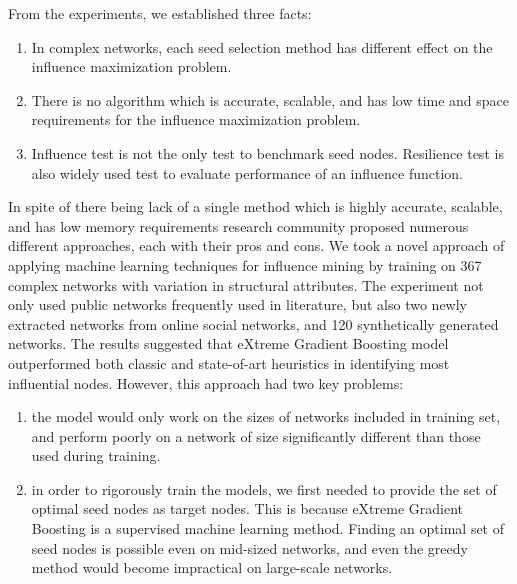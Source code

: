 	From the experiments, we established three facts:
	
	\begin{enumerate}
		\item In complex networks, each seed selection method has different effect on the influence maximization problem.
		
		\item There is no algorithm which is accurate, scalable, and has low time and space requirements for the influence maximization problem.
		
		\item Influence test is not the only test to benchmark seed nodes. Resilience test is also widely used test to evaluate performance of an influence function.
		
	\end{enumerate}    
	
	In spite of there being lack of a single method which is highly accurate, scalable, and has low memory requirements research community proposed numerous different approaches, each with their pros and cons. We took a novel approach of applying machine learning techniques for influence mining by training on 367 complex networks with variation in structural attributes. The experiment not only used public networks frequently used in literature, but also two newly extracted networks from online social networks, and 120 synthetically generated networks. The results suggested that eXtreme Gradient Boosting model outperformed both classic and state-of-art heuristics in identifying most influential nodes. However, this approach had two key problems:
	
	\begin{enumerate}
		\item the model would only work on the sizes of networks included in training set, and perform poorly on a network of size significantly different than those used during training.
		
		\item in order to rigorously train the models, we first needed to provide the set of optimal seed nodes as target nodes. This is because eXtreme Gradient Boosting is a supervised machine learning method. Finding an optimal set of seed nodes is possible even on mid-sized networks, and even the greedy method would become impractical on large-scale networks.
	\end{enumerate}
	
